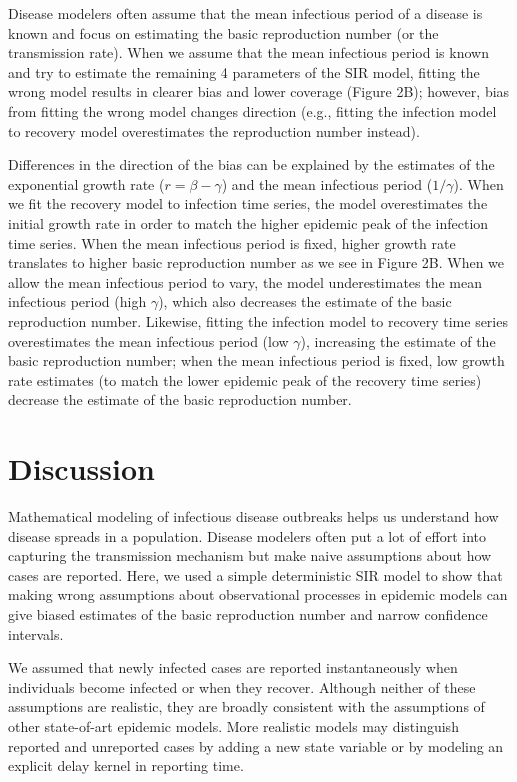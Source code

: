\documentclass{article}\usepackage[]{graphicx}\usepackage[]{color}
\begin{document}
Disease modelers often assume that the mean infectious period of a disease
is known and focus on estimating the basic reproduction number (or the 
transmission rate). When we assume that the mean infectious period is known
and try to estimate the remaining 4 parameters of the SIR model, fitting the
wrong model results in clearer bias and lower coverage (Figure 2B); however, 
bias from fitting the wrong model changes direction (e.g., fitting the infection
model to recovery model overestimates the reproduction number instead). 

Differences in the direction of the bias can be explained by the estimates of the
exponential growth rate ($r = \beta - \gamma$) and the mean infectious period ($1/\gamma$).
When we fit the recovery model to infection time series, the model overestimates
the initial growth rate in order to match the higher epidemic peak of the 
infection time series. When the mean infectious period is fixed, higher growth rate
translates to higher basic reproduction number as we see in Figure 2B. When we allow
the mean infectious period to vary, the model underestimates the mean infectious
period (high $\gamma$), which also decreases the estimate of the basic reproduction number.
Likewise, fitting the infection model to recovery time series overestimates the
mean infectious period (low $\gamma$), increasing the estimate of the basic reproduction number;
when the mean infectious period is fixed, low growth rate estimates (to match the
lower epidemic peak of the recovery time series) decrease the estimate of the
basic reproduction number.

\section{Discussion}

Mathematical modeling of infectious disease outbreaks helps us understand 
how disease spreads in a population. Disease modelers often put a lot of
effort into capturing the transmission mechanism but make naive assumptions
about how cases are reported. Here, we used a simple deterministic SIR model to show that 
making wrong assumptions about observational processes in epidemic models
can give biased estimates of the basic reproduction number and narrow
confidence intervals.

We assumed that newly infected cases are reported instantaneously when
individuals become infected or when they recover. Although neither of these
assumptions are realistic, they are broadly consistent with the assumptions
of other state-of-art epidemic models. More realistic models may distinguish
reported and unreported cases by adding a new state variable or by modeling
an explicit delay kernel in reporting time.
\end{document}
